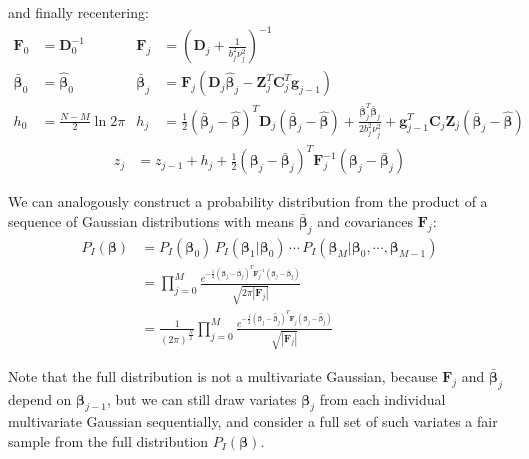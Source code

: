 \documentclass{amsart}
\newcommand{\bm}[1]{\ensuremath{\boldsymbol{#1}}}
\begin{document}
and finally recentering:
\begin{align}
  \bm{F}_0 &= \bm{D}_0^{-1} &
  \bm{F}_j &= \left(\bm{D}_j + \frac{1}{b_j^2\nu_j^2}\right)^{-1} \\
  \bar{\bm{\beta}}_0 &= \hat{\bm{\beta}}_0 &
  \bar{\bm{\beta}}_j &=
  \bm{F}_j
  \left(\bm{D}_j\hat{\bm{\beta}}_j-\bm{Z}_j^T\!\bm{C}_j^T\bm{g}_{j-1}\right) \\
  h_0 &= \frac{N-M}{2}\ln 2\pi &
  h_j &=
  \frac{1}{2}\left(\bar{\bm{\beta}}_j-\hat{\bm{\beta}}\right)^T\!\bm{D}_j
  \left(\bar{\bm{\beta}}_j-\hat{\bm{\beta}}\right) +
  \frac{\bar{\bm{\beta}}_j^T\!\bar{\bm{\beta}}_j}{2b_j^2\nu_j^2}
  +
  \bm{g}_{j-1}^T\bm{C}_j\bm{Z}_j\left(\bar{\bm{\beta}}_j-\hat{\bm{\beta}}\right)
\end{align}
\begin{align}
  z_j &= z_{j-1} + h_j
  +
  \frac{1}{2}\left(\bm{\beta}_j-\bar{\bm{\beta}}_j\right)^T\!
  \bm{F}_j^{-1}
  \left(\bm{\beta}_j-\bar{\bm{\beta}}_j\right)
\end{align}

We can analogously construct a probability distribution from the
product of a sequence of Gaussian distributions with means
$\bar{\bm{\beta}}_j$ and covariances $\bm{F}_j$:
\begin{align}
  P_I(\bm{\beta}) &= P_I(\bm{\beta}_0)\,
  P_I(\bm{\beta}_1|\bm{\beta}_0)\,\dotsi\,
  P_I(\bm{\beta}_M|\bm{\beta}_0,\dotsi,\bm{\beta}_{M-1})\\
  &= \prod_{j=0}^M
  \frac{e^{-\frac{1}{2}\left(\bm{\beta}_j-\bar{\bm{\beta}}_j\right)^T\!\bm{F}_j^{-1}\!
      \left(\bm{\beta}_j-\bar{\bm{\beta}}_j\right)}}
       {\sqrt{2\pi\left|\bm{F}_j\right|}}\\
     &=
       \frac{1}{(2\pi)^{\frac{N}{2}}} \prod_{j=0}^M 
       \frac{e^{-\frac{1}{2}\left(\bm{\beta}_j-\hat{\bm{\beta}}_j\right)^T\!\bm{F}_j
           \left(\bm{\beta}_j-\hat{\bm{\beta}}_j\right)}}
            {\sqrt{\left|\bm{F}_j\right|}}
\end{align}

Note that the full distribution is not a multivariate Gaussian,
because $\bm{F}_j$ and $\bar{\bm{\beta}}_j$ depend on $\bm{\beta}_{j-1}$,
but we can still draw variates $\bm{\beta}_j$ from each individual
multivariate Gaussian sequentially, and consider a full set of such
variates a fair sample from the full distribution $P_I(\bm{\beta})$.
\end{document}
